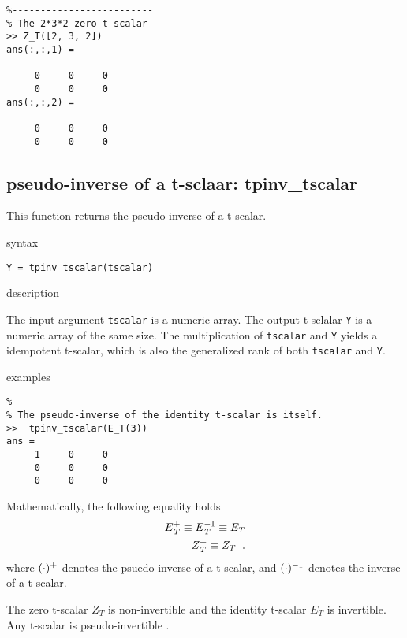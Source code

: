 \documentclass[12pt,reqno]{amsart}
\numberwithin{equation}{section}
\numberwithin{figure}{section}
\numberwithin{table}{section}
\theoremstyle{definition}
\begin{document}
\begin{verbatim}
%-------------------------   
% The 2*3*2 zero t-scalar  
>> Z_T([2, 3, 2])
ans(:,:,1) =

     0     0     0
     0     0     0
ans(:,:,2) =

     0     0     0
     0     0     0
\end{verbatim}



\subsection{{\color{blue} \sc pseudo-inverse of a t-sclaar}: {\color{blue}tpinv\_tscalar}} 
This function returns the pseudo-inverse of a t-scalar. 



\noindent 
{\color{red} \sc syntax}

{\tt  Y = tpinv\_tscalar(tscalar) }


\noindent
{\color{red} \sc description}

The input argument {\tt tscalar} is a numeric array. The output t-sclalar  {\tt Y} is a numeric array of the same size.  
The multiplication of {\tt tscalar}  and {\tt Y}  yields a idempotent t-scalar, which is also the generalized rank of both  {\tt tscalar}  and {\tt Y}. 


\noindent
{\color{red} \sc examples}
\begin{verbatim}
%------------------------------------------------------   
% The pseudo-inverse of the identity t-scalar is itself.   
>>  tpinv_tscalar(E_T(3))
ans =
     1     0     0
     0     0     0
     0     0     0
\end{verbatim}

Mathematically, the following equality holds
\begin{equation}
\begin{aligned}
E_\mathit{T}^{\scalebox{0.8}{$+$}} \equiv E_\mathit{T}^{\scalebox{0.8}{$-1$}} \equiv E_{T} \\
Z_\mathit{T}^{\scalebox{0.8}{$+$}} \equiv Z_{T} \;\;.
\end{aligned}
\end{equation}
where $(\cdot)^{\scalebox{0.8}{$+$}}$ denotes the psuedo-inverse of a t-scalar, 
and $(\cdot)^{\scalebox{0.8}{$-1$}}$ denotes the inverse of a t-scalar.

The zero t-scalar $Z_{T}$ is non-invertible and the identity t-scalar $E_T$ is invertible. Any t-scalar is pseudo-invertible \cite{liao2020general,liao2020generalized}.  




\end{document}
